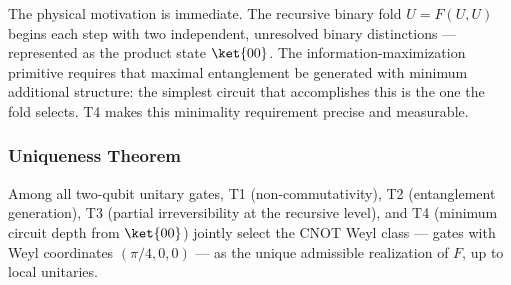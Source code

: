 The physical motivation is immediate. The recursive binary fold
$U = F(U,U)$ begins each step with two independent, unresolved binary
distinctions — represented as the product state $\ket{00}$. The
information-maximization primitive requires that maximal entanglement
be generated with minimum additional structure: the simplest circuit
that accomplishes this is the one the fold selects. T4 makes this
minimality requirement precise and measurable.

\subsubsection*{Uniqueness Theorem}

\begin{theorem}
\label{thm:CNOT_uniqueness}
Among all two-qubit unitary gates, T1 (non-commutativity),
T2 (entanglement generation), T3 (partial irreversibility at
the recursive level), and T4 (minimum circuit depth from $\ket{00}$)
jointly select the CNOT Weyl class --- gates with Weyl coordinates
$(\pi/4, 0, 0)$ --- as the unique admissible realization of $F$,
up to local unitaries.
\end{theorem}

